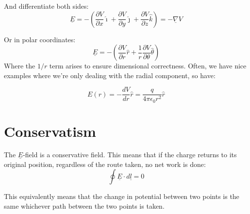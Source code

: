 And differentiate both sides:
\[
    \underline{E} = - \left(\frac{\partial V}{\partial x} \hat{\imath} + \frac{\partial V}{\partial y} \hat{\jmath} + \frac{\partial V}{\partial z} \hat{k} \right) = - \underline{\nabla} V
\]

Or in polar coordinates:
\[
    \underline{E} = - \left(\frac{\partial V}{\partial r} \hat{r} + \frac{1}{r} \frac{\partial V}{\partial \theta} \hat{\theta}\right)
\]
Where the $1/r$ term arises to ensure dimensional correctness. Often, we have nice examples where we're only dealing with the radial component, so have:

\[
    E(r) = -\frac{dV}{dr} \hat{r} = \frac{q}{4 \pi \epsilon_0 r^2} \hat{r}
\]

\section{Conservatism}
The $\underline{E}$-field is a conservative field. This means that if the charge returns to its original position, regardless of the route taken, no net work is done:
\[
    \oint \underline{E} \cdot d \underline{l} = 0
\]

This equivalently means that the change in potential between two points is the same whichever path between the two points is taken.